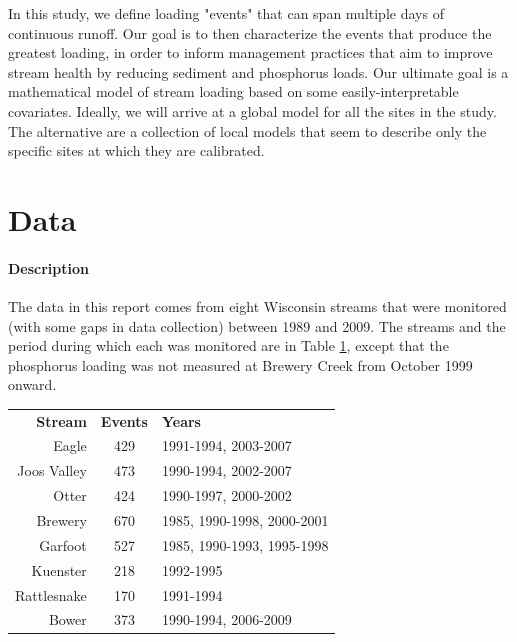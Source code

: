 \documentclass[10pt]{article}
\begin{document}
In this study, we define loading "events" that can span multiple days of continuous runoff. Our goal is to then characterize the events that produce the greatest loading, in order to inform management practices that aim to improve stream health by reducing sediment and phosphorus loads. Our ultimate goal is a mathematical model of stream loading based on some easily-interpretable covariates. Ideally, we will arrive at a global model for all the sites in the study. The alternative are a collection of local models that seem to describe only the specific sites at which they are calibrated.\\

\section{Data}
\paragraph{Description}
The data in this report comes from eight Wisconsin streams that were monitored (with some gaps in data collection) between 1989 and 2009. The streams and the period during which each was monitored are in Table \ref{table:dates}, except that the phosphorus loading was not measured at Brewery Creek from October 1999 onward.\\

\begin{table}[h]
\begin{center}
\begin{tabular}{r c l}
        \textbf{Stream}  & \textbf{Events} & \textbf{Years}\\
        Eagle & 429 & 1991-1994, 2003-2007\\
        Joos Valley & 473 & 1990-1994, 2002-2007\\
        Otter & 424 & 1990-1997, 2000-2002\\
        Brewery & 670 & 1985, 1990-1998, 2000-2001\\
        Garfoot & 527 & 1985, 1990-1993, 1995-1998\\
        Kuenster & 218 & 1992-1995\\
        Rattlesnake & 170 & 1991-1994\\
        Bower & 373 & 1990-1994, 2006-2009\\
    \end{tabular}
    \label{table:dates}
\end{center}
\end{table}
\end{document}
